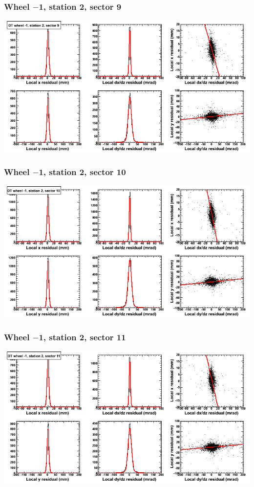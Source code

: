 \documentclass[compress]{beamer}
\begin{document}
\begin{frame}
\frametitle{Wheel $-$1, station 2, sector 9}
\includegraphics[width=\linewidth]{tmpbell_MBwhBst2sec09.png}
\end{frame}

\begin{frame}
\frametitle{Wheel $-$1, station 2, sector 10}
\includegraphics[width=\linewidth]{tmpbell_MBwhBst2sec10.png}
\end{frame}

\begin{frame}
\frametitle{Wheel $-$1, station 2, sector 11}
\includegraphics[width=\linewidth]{tmpbell_MBwhBst2sec11.png}
\end{frame}
\end{document}
